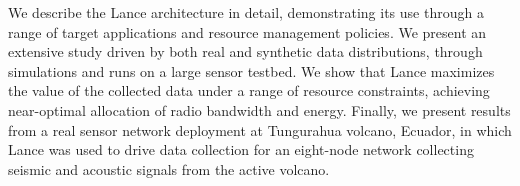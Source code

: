 \documentclass[lettersize]{sig-alternate-konrad}
\begin{document}
We describe the Lance architecture in detail, demonstrating its
use through a range of target applications and resource management
policies. We present an extensive study driven by both 
real and synthetic data distributions, through simulations and runs
on a large sensor testbed.  We show that Lance maximizes 
the value of the collected data under a range of resource 
constraints, achieving near-optimal allocation of radio bandwidth and
energy. Finally, we present results from a real sensor network
deployment at Tungurahua volcano, Ecuador, in which Lance was used to
drive data collection for an eight-node network collecting seismic and
acoustic signals from the active volcano.  



\vspace{-0.1in}
\vspace{-0.1in}












 
\end{document}
